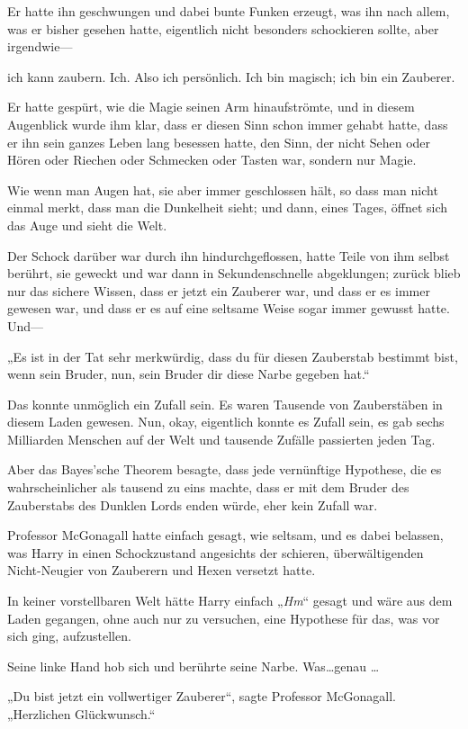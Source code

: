 {Er hatte ihn geschwungen und dabei bunte Funken erzeugt, was ihn nach allem, was er bisher gesehen hatte, eigentlich nicht besonders schockieren sollte, aber irgendwie—

ich kann zaubern. Ich. Also ich persönlich. Ich bin magisch; ich bin ein Zauberer.

Er hatte gespürt, wie die Magie seinen Arm hinaufströmte, und in diesem Augenblick wurde ihm klar, dass er diesen Sinn schon immer gehabt hatte, dass er ihn sein ganzes Leben lang besessen hatte, den Sinn, der nicht Sehen oder Hören oder Riechen oder Schmecken oder Tasten war, sondern nur Magie.

Wie wenn man Augen hat, sie aber immer geschlossen hält, so dass man nicht einmal merkt, dass man die Dunkelheit sieht; und dann, eines Tages, öffnet sich das Auge und sieht die Welt.

Der Schock darüber war durch ihn hindurchgeflossen, hatte Teile von ihm selbst berührt, sie geweckt und war dann in Sekundenschnelle abgeklungen; zurück blieb nur das sichere Wissen, dass er jetzt ein Zauberer war, und dass er es immer gewesen war, und dass er es auf eine seltsame Weise sogar immer gewusst hatte. Und—

„Es ist in der Tat sehr merkwürdig, dass du für diesen Zauberstab bestimmt bist, wenn sein Bruder, nun, sein Bruder dir diese Narbe gegeben hat.“

Das konnte unmöglich ein Zufall sein. Es waren Tausende von Zauberstäben in diesem Laden gewesen. Nun, okay, eigentlich konnte es Zufall sein, es gab sechs Milliarden Menschen auf der Welt und tausende Zufälle passierten jeden Tag.

Aber das Bayes'sche Theorem besagte, dass jede vernünftige Hypothese, die es wahrscheinlicher als tausend zu eins machte, dass er mit dem Bruder des Zauberstabs des Dunklen Lords enden würde, eher kein Zufall war.

Professor McGonagall hatte einfach gesagt, wie seltsam, und es dabei belassen, was Harry in einen Schockzustand angesichts der schieren, überwältigenden Nicht-Neugier von Zauberern und Hexen versetzt hatte.

In keiner vorstellbaren Welt hätte Harry einfach „\emph{Hm}“ gesagt und wäre aus dem Laden gegangen, ohne auch nur zu versuchen, eine Hypothese für das, was vor sich ging, aufzustellen.

Seine linke Hand hob sich und berührte seine Narbe. Was…genau …

„Du bist jetzt ein vollwertiger Zauberer“, sagte Professor McGonagall. „Herzlichen Glückwunsch.“

}
